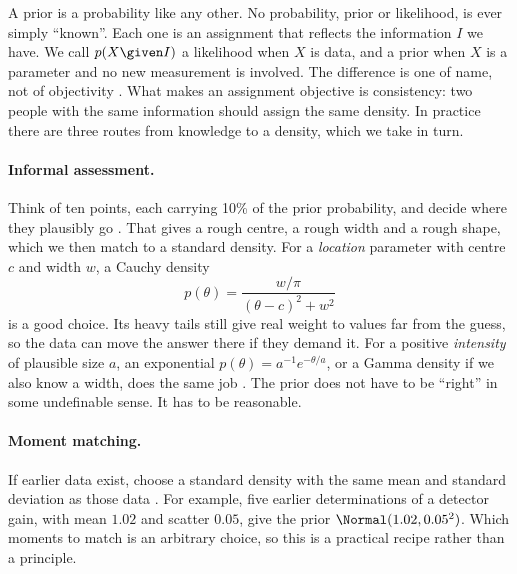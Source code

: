 A prior is a probability like any other. No probability, prior or likelihood, is ever
simply ``known''. Each one is an assignment that reflects the information $I$ we have.
We call $p(X\given I)$ a likelihood when $X$ is data, and a prior when $X$ is a
parameter and no new measurement is involved. The difference is one of name, not of
objectivity . What makes an assignment objective is consistency:
two people with the same information should assign the same density. In practice there
are three routes from knowledge to a density, which we take in turn.

\paragraph{Informal assessment.} Think of ten points, each carrying 10\% of the prior
probability, and decide where they plausibly go . That gives
a rough centre, a rough width and a rough shape, which we then match to a standard
density. For a \emph{location} parameter  with centre $c$ and width $w$, a Cauchy density
\begin{equation*}
  p(\theta)=\frac{w/\pi}{(\theta-c)^2+w^2}
\end{equation*}
is a good choice. Its heavy tails still give real weight to values far from the guess,
so the data can move the answer there if they demand it. For a positive \emph{intensity}  of plausible size $a$, an exponential
$p(\theta)=a^{-1}e^{-\theta/a}$, or a Gamma density if we also know a width, does the same
job . The prior does not have to be ``right'' in some
undefinable sense. It has to be reasonable.

\paragraph{Moment matching.} If earlier data exist, choose a standard density with the
same mean and standard deviation as those data . For example,
five earlier determinations of a detector gain, with mean $1.02$ and scatter $0.05$,
give the prior $\Normal(1.02,0.05^2)$. Which moments to match is an arbitrary choice, so
this is a practical recipe rather than a principle.

